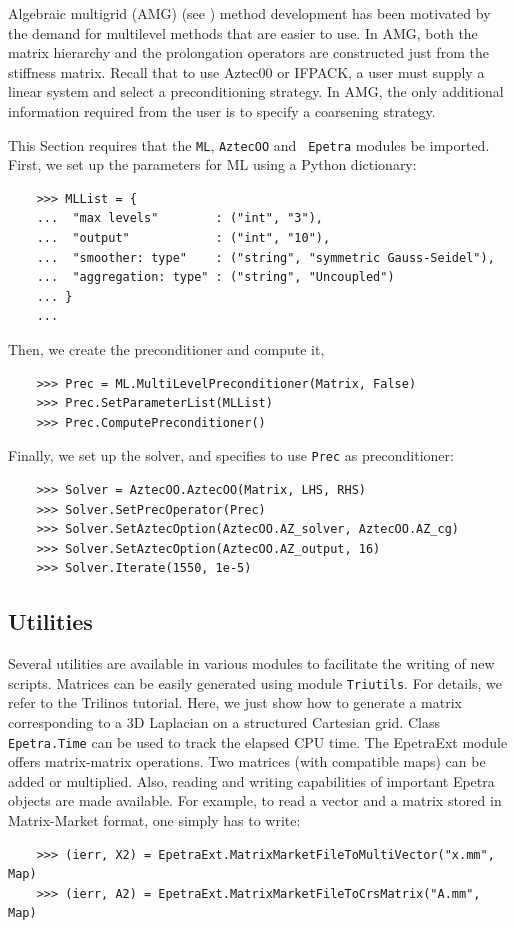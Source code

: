 \documentclass[10pt,relax]{SANDreport}
\begin{document}
Algebraic multigrid (AMG) (see \cite[Section 8]{Briggs}) method
development has been motivated by the demand for multilevel methods
that are easier to use.  In AMG, both the matrix hierarchy and the
prolongation operators are constructed just from the stiffness matrix.
Recall that to use Aztec00 or IFPACK, a user must supply a linear
system and select a preconditioning strategy.  In AMG, the only
additional information required from the user is to specify a
coarsening strategy.

This Section requires that the {\tt ML}, {\tt AztecOO} and {\tt
  Epetra} modules be imported. First, we set up the parameters for ML
using a Python dictionary:
\begin{verbatim}
    >>> MLList = {
    ...  "max levels"        : ("int", "3"),
    ...  "output"            : ("int", "10"),
    ...  "smoother: type"    : ("string", "symmetric Gauss-Seidel"),
    ...  "aggregation: type" : ("string", "Uncoupled")
    ... }
    ...
\end{verbatim}
Then, we create the preconditioner and compute it,
\begin{verbatim}
    >>> Prec = ML.MultiLevelPreconditioner(Matrix, False)
    >>> Prec.SetParameterList(MLList)
    >>> Prec.ComputePreconditioner()
\end{verbatim}
Finally, we set up the solver, and specifies to use {\tt Prec} as
preconditioner:
\begin{verbatim}
    >>> Solver = AztecOO.AztecOO(Matrix, LHS, RHS)
    >>> Solver.SetPrecOperator(Prec)
    >>> Solver.SetAztecOption(AztecOO.AZ_solver, AztecOO.AZ_cg)
    >>> Solver.SetAztecOption(AztecOO.AZ_output, 16)
    >>> Solver.Iterate(1550, 1e-5)
\end{verbatim}

\subsection{Utilities}
\label{subsec:utilities}

Several utilities are available in various modules to facilitate the
writing of new scripts.  Matrices can be easily generated using module
{\tt Triutils}. For details, we refer to the Trilinos tutorial. Here,
we just show how to generate a matrix corresponding to a 3D Laplacian
on a structured Cartesian grid.  Class {\tt Epetra.Time} can be used
to track the elapsed CPU time.  The EpetraExt module offers
matrix-matrix operations. Two matrices (with compatible maps) can be
added or multiplied. Also, reading and writing capabilities of
important Epetra objects are made available. For example, to read a
vector and a matrix stored in Matrix-Market format, one simply has to
write:
\begin{verbatim}
    >>> (ierr, X2) = EpetraExt.MatrixMarketFileToMultiVector("x.mm", Map)
    >>> (ierr, A2) = EpetraExt.MatrixMarketFileToCrsMatrix("A.mm", Map)
\end{verbatim}
\end{document}
